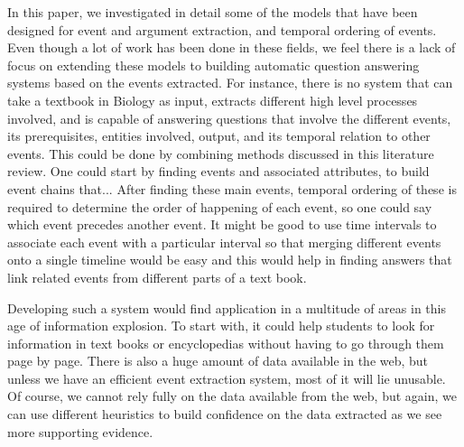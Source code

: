 In this paper, we investigated in detail some of the models that have been designed for event and argument extraction, and temporal ordering of events. Even though a lot of work has been done in these fields, we feel there is a lack of focus on extending these models to building automatic question answering systems based on the events extracted. For instance, there is no system that can take a textbook in Biology as input, extracts different high level processes involved, and is capable of answering questions that involve the different events, its prerequisites, entities involved, output, and its temporal relation to other events. This could be done by combining methods discussed in this literature review. One could start by finding events and associated attributes, to build event chains that... After finding these main events, temporal ordering of these is required to determine the order of happening of each event, so one could say which event precedes another event. It might be good to use time intervals to associate each event with a particular interval so that merging different events onto a single timeline would be easy and this would help in finding answers that link related events from different parts of a text book.

Developing such a system would find application in a multitude of areas in this age of information explosion. To start with, it could help students to look for information in text books or encyclopedias without having to go through them page by page. There is also a huge amount of data available in the web, but unless we have an efficient event extraction system, most of it will lie unusable. Of course, we cannot rely fully on the data available from the web, but again, we can use different heuristics to build confidence on the data extracted as we see more supporting evidence.